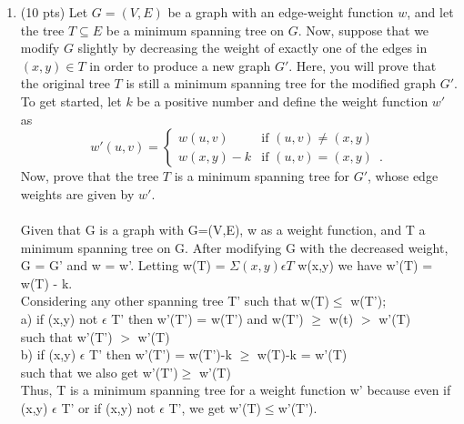 \documentclass[12pt]{article}
\begin{document}
\begin{enumerate}
	\item \label{2} (10 pts) Let $G=(V,E)$ be a graph with an edge-weight function $w$, and let the tree $T\subseteq E$ be a minimum spanning tree on $G$. Now, suppose that we modify $G$ slightly by decreasing the weight of exactly one of the edges in $(x,y)\in T$ in order to produce a new graph $G'$. Here, you will prove that the original tree $T$ is still a minimum spanning tree for the modified graph $G'$. \\
	 To get started, let $k$ be a positive number and define the weight function $w'$ as
%
\begin{displaymath}
w'(u,v) = \left\{
\begin{array}{ll}
w(u,v) & \textrm{if $(u,v)\not= (x,y)$} \\
w(x,y)-k & \textrm{if $(u,v)=(x,y)$} \enspace .
\end{array}\right.
\end{displaymath}
%
Now, prove that the tree $T$ is a minimum spanning tree for $G'$, whose edge weights are given by $w'$.\\
	\\ Given that G is a graph with G=(V,E), w as a weight function, and T a minimum spanning tree on G. After modifying G with the decreased weight, G = G' and w = w'. Letting w(T) = $\Sigma (x,y) \epsilon T$ w(x,y) we have w'(T) = w(T) - k. \\
	Considering any other spanning tree T' such that w(T)$\leq$ w(T');\\
	\hspace*{10mm} a) if (x,y) not $\epsilon$ T' then w'(T') = w(T') and w(T') $\geq$ w(t) $>$ w'(T)\\ 
	\hspace*{25mm}such that w'(T') $>$ w'(T) \\
	\hspace*{10mm} b) if (x,y) $\epsilon$ T' then w'(T') = w(T')-k $\geq$ w(T)-k = w'(T)\\ 
	\hspace*{25mm}such that we also get w'(T')$\geq$ w'(T) \\
	Thus, T is a minimum spanning tree for a weight function w' because even if (x,y) $\epsilon$ T' or if (x,y) not $\epsilon$ T', we get w'(T)$\leq$w'(T'). 
	
	 
	\pagebreak






\end{enumerate}
\end{document}
